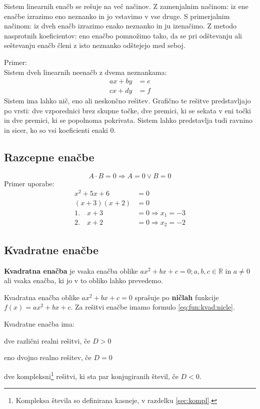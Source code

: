 \documentclass[a4paper,oneside,12pt,fleqn]{article}
\def\R{\ensuremath{\mathbb R}}
\newcommand\krat\cdot
\renewcommand\implies\Rightarrow
\numberwithin{equation}{section}
\newenvironment{itemize*}%
{
\vspace{-12pt}%
\begin{itemize}%
\setlength{\itemsep}{0pt}%
\setlength{\parskip}{2pt}}%
{\end{itemize}}
\begin{document}
Sistem linearnih enačb se rešuje na več načinov. Z zamenjalnim načinom: iz ene enačbe
izrazimo eno neznanko in jo vstavimo v vse druge. S primerjalnim načinom: iz dveh enačb
izrazimo enako neznanko in ju izenačimo. Z metodo
nasprotnih koeficientov: eno enačbo pomnožimo tako, da se pri odštevanju ali seštevanju
enačb členi z isto neznanko odštejejo med seboj.

Primer:\\
Sistem dveh linearnih neenačb z dvema neznankama:
\begin{align*}
  ax + by &= e \\
  cx + dy &= f
\end{align*}
Sistem ima lahko nič, eno ali neskončno rešitev. Grafično te rešitve predstavljajo po
vrsti: dve vzporednici brez skupne točke, dve premici, ki se sekata v eni točki in dve
premici, ki se popolnoma pokrivata. Sistem lahko predstavlja tudi ravnino in sicer, ko so
vsi koeficienti enaki 0.

\subsection{Razcepne enačbe}
\label{sec:enac:razc}
\[ A \krat B = 0 \implies A = 0 \lor B = 0 \]
Primer uporabe:
\begin{align*}
  x^2 +5x + 6 &= 0 \\
  (x+3)(x+2) &= 0 \\
  1.\quad x + 3 &= 0 \implies x_1 = -3 \\
  2.\quad x + 2 &= 0 \implies x_2 = -2
\end{align*}

\subsection{Kvadratne enačbe}
\label{sec:enac:kvad}
\textbf{Kvadratna enačba} je vsaka enačba oblike $ax^2 + bx + c = 0; a, b, c \in \R$ in $a \neq 0$
ali vsaka enačba, ki jo v to obliko lahko prevedemo.

Kvadratna enačba oblike $ax^2 + bx + c = 0$ sprašuje po \textbf{ničlah} funkcije $f(x) = ax^2 + bx
+ c$. Za rešitvi enačbe imamo formulo \eqref{eq:fun:kvad:nicle}.

Kvadratne enačba ima:
\begin{itemize*}
  \item dve različni realni rešitvi, če $D > 0$
  \item eno dvojno realno rešitev, če $D = 0$
  \item dve kompleksni\footnote{Kompleksa števila so definirana kasneje, v razdelku
    \ref{sec:kompl}.\label{fn:komplnotyet}} rešitvi, ki sta par konjugiranih števil, če $D < 0$.
\end{itemize*}
\end{document}
